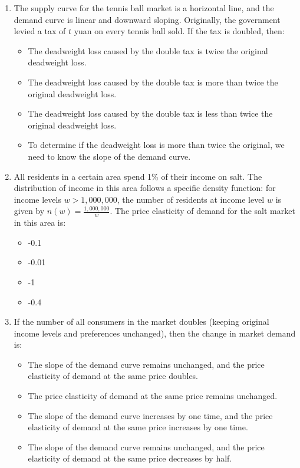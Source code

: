 \documentclass[12pt, a4paper]{article}
\begin{document}
\begin{enumerate}
\item The supply curve for the tennis ball market is a horizontal line, and the demand curve is linear and downward sloping. Originally, the government levied a tax of $t$ yuan on every tennis ball sold. If the tax is doubled, then:
    \begin{itemize}
        \item[A.] The deadweight loss caused by the double tax is twice the original deadweight loss.
        \item[B.] The deadweight loss caused by the double tax is more than twice the original deadweight loss.
        \item[C.] The deadweight loss caused by the double tax is less than twice the original deadweight loss.
        \item[D.] To determine if the deadweight loss is more than twice the original, we need to know the slope of the demand curve.
    \end{itemize}

\item All residents in a certain area spend 1\% of their income on salt. The distribution of income in this area follows a specific density function: for income levels $w > 1,000,000$, the number of residents at income level $w$ is given by $n(w) = \frac{1,000,000}{w}$. The price elasticity of demand for the salt market in this area is:
    \begin{itemize}
        \item[A.] -0.1
        \item[B.] -0.01
        \item[C.] -1
        \item[D.] -0.4
    \end{itemize}

\item If the number of all consumers in the market doubles (keeping original income levels and preferences unchanged), then the change in market demand is:
    \begin{itemize}
        \item[A.] The slope of the demand curve remains unchanged, and the price elasticity of demand at the same price doubles.
        \item[B.] The price elasticity of demand at the same price remains unchanged.
        \item[C.] The slope of the demand curve increases by one time, and the price elasticity of demand at the same price increases by one time.
        \item[D.] The slope of the demand curve remains unchanged, and the price elasticity of demand at the same price decreases by half.
    \end{itemize}


\end{enumerate}
\end{document}
